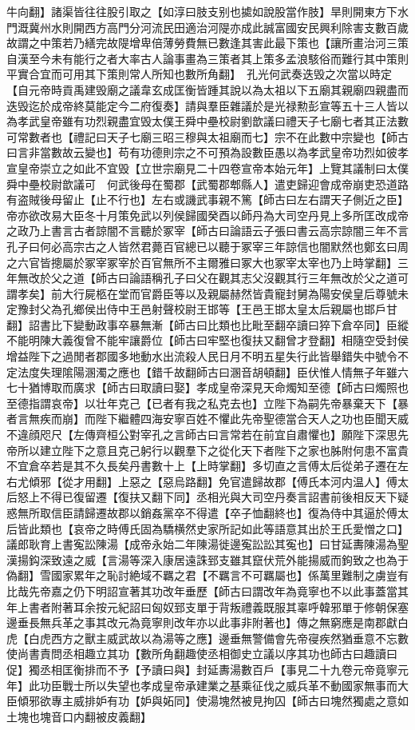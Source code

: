 牛向翻】諸渠皆往往股引取之【如淳曰肢支别也㨿如說股當作肢】旱則開東方下水門溉冀州水則開西方高門分河流民田適治河隄亦成此誠富國安民興利除害支數百歲故謂之中策若乃繕完故隄增卑倍薄勞費無已數逢其害此最下策也【讓所畫治河三策自漢至今未有能行之者大率古人論事畫為三策者其上策多孟浪駭俗而難行其中策則平實合宜而可用其下策則常人所知也數所角翻】　孔光何武奏迭毁之次當以時定【自元帝時貢禹建毁廟之議韋玄成匡衡皆踵其說以為太祖以下五廟其親廟四親盡而迭毁迄於成帝終莫能定今二府復奏】請與羣臣雜議於是光禄勲彭宣等五十三人皆以為孝武皇帝雖有功烈親盡宜毁太僕王舜中壘校尉劉歆議曰禮天子七廟七者其正法數可常數者也【禮記曰天子七廟三昭三穆與太祖廟而七】宗不在此數中宗變也【師古曰言非當數故云變也】苟有功德則宗之不可預為設數臣愚以為孝武皇帝功烈如彼孝宣皇帝崇立之如此不宜毁【立世宗廟見二十四卷宣帝本始元年】上覽其議制曰太僕舜中壘校尉歆議可　何武後母在蜀郡【武蜀郡郫縣人】遣吏歸迎會成帝崩吏恐道路有盗賊後母留止【止不行也】左右或譏武事親不篤【師古曰左右謂天子側近之臣】帝亦欲改易大臣冬十月策免武以列侯歸國癸酉以師丹為大司空丹見上多所匡改成帝之政乃上書言古者諒闇不言聽於冢宰【師古曰論語云子張曰書云高宗諒闇三年不言孔子曰何必高宗古之人皆然君薨百官總已以聽于冢宰三年諒信也闇默然也鄭玄曰周之六官皆摠屬於冢宰冢宰於百官無所不主爾雅曰冢大也冢宰太宰也乃上時掌翻】三年無改於父之道【師古曰論語稱孔子曰父在觀其志父沒觀其行三年無改於父之道可謂孝矣】前大行屍柩在堂而官爵臣等以及親屬赫然皆貴寵封舅為陽安侯皇后尊號未定豫封父為孔鄉侯出侍中王邑射聲校尉王邯等【王邑王邯太皇太后親屬也邯戶甘翻】詔書比下變動政事卒暴無漸【師古曰比類也比毗至翻卒讀曰猝下倉卒同】臣縱不能明陳大義復曾不能牢讓爵位【師古曰牢堅也復扶又翻曾才登翻】相隨空受封侯增益陛下之過閒者郡國多地動水出流殺人民日月不明五星失行此皆舉錯失中號令不定法度失理隂陽溷濁之應也【錯千故翻師古曰溷音胡頓翻】臣伏惟人情無子年雖六七十猶博取而廣求【師古曰取讀曰娶】孝成皇帝深見天命燭知至德【師古曰燭照也至德指謂哀帝】以壮年克己【已者有我之私克去也】立陛下為嗣先帝暴棄天下【暴者言無疾而崩】而陛下繼體四海安寧百姓不懼此先帝聖德當合天人之功也臣聞天威不違顔咫尺【左傳齊桓公對宰孔之言師古曰言常若在前宜自肅懼也】願陛下深思先帝所以建立陛下之意且克己躬行以觀羣下之從化天下者陛下之家也胏附何患不富貴不宜倉卒若是其不久長矣丹書數十上【上時掌翻】多切直之言傅太后從弟子遷在左右尤傾邪【從才用翻】上惡之【惡烏路翻】免官遣歸故郡【傅氏本河内温人】傅太后怒上不得已復留遷【復扶又翻下同】丞相光與大司空丹奏言詔書前後相反天下疑惑無所取信臣請歸遷故郡以銷姦黨卒不得遣【卒子恤翻終也】復為侍中其逼於傅太后皆此類也【哀帝之時傅氏固為驕横然史家所記如此等語意其出於王氏愛憎之口】　議郎耿育上書寃訟陳湯【成帝永始二年陳湯徙邊寃訟訟其寃也】曰甘延夀陳湯為聖漢揚鈎深致遠之威【言湯等深入康居遠誅郅支雖其竄伏荒外能揚威而鉤致之也為于偽翻】雪國家累年之恥討絶域不羈之君【不羈言不可羈屬也】係萬里難制之虜豈有比哉先帝嘉之仍下明詔宣著其功改年垂歷【師古曰謂改年為竟寧也不以此事蓋當其年上書者附著耳余按元紀詔曰匈奴郅支單于背叛禮義既服其辜呼韓邪單于修朝保塞邊垂長無兵革之事其改元為竟寧則改年亦以此事非附著也】傳之無窮應是南郡獻白虎【白虎西方之獸主威武故以為湯等之應】邊垂無警備會先帝寑疾然猶垂意不忘數使尚書責問丞相趣立其功【數所角翻趣使丞相御史立議以序其功也師古曰趣讀曰促】獨丞相匡衡排而不予【予讀曰與】封延夀湯數百戶【事見二十九卷元帝竟寧元年】此功臣戰士所以失望也孝成皇帝承建業之基乘征伐之威兵革不動國家無事而大臣傾邪欲專主威排妒有功【妒與妬同】使湯塊然被見拘囚【師古曰塊然獨處之意如土塊也塊音口内翻被皮義翻】